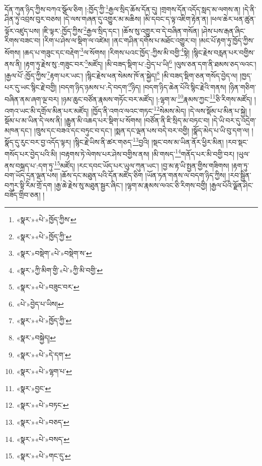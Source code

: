 \documentclass[12pt,a4paper]{book}
\begin{document}
དོན་ཀུན་ཉིད་ཀྱིས་བཀའ་སྩོལ་ཅིག །:ཁྱོད་ཀྱི་\footnote{«སྣར་»«པེ་»ཁྱོད་ཀྱིས་}རྒྱལ་སྲིད་ཆོས་དོན་དུ། །གྲགས་དོན་འདོད་སླད་མ་ལགས་ན། །དེ་ནི་ཤིན་ཏུ་འབྲས་བུར་བཅས། །དེ་ལས་གཞན་དུ་འགྱུར་མ་མཆིས། །མི་དབང་ད་ལྟ་འཇིག་རྟེན་ན། །ཕལ་ཆེར་ཕན་ཚུན་ལྟོར་འཛུད་པས། །ཇི་ལྟར་:ཁྱོད་ཀྱིས་\footnote{«སྣར་»«པེ་»ཁྱོད་ཀྱི་}རྒྱལ་སྲིད་དང་། །ཆོས་སུ་འགྱུར་བ་དེ་བཞིན་གསོན། །ཤེས་པས་རྒན་ཞིང་རིགས་བཟང་བ། །རིག་པ་ཤེས་ལ་སྡིག་ལ་འཛེམ། །ནང་གཤིན་དགོས་པ་མཐོང་འགྱུར་བ། །མང་པོ་རྟག་ཏུ་ཁྱོད་ཀྱིས་སོགས། །ཆད་པ་གཟུང་དང་བརྡེག་\footnote{«སྣར་»བསྡེག་«པེ་»བསྡེག་ས་}ལ་སོགས། །རིགས་པའང་ཁྱོད་:ཀྱིས་མི་བགྱི་\footnote{«སྣར་»ཀྱི་མིག་གྱི་«པེ་»ཀྱི་མི་བགྱི་}སྟེ། །སྙིང་རྗེས་བརླན་པར་བགྱིས་ནས་ནི། །རྟག་ཏུ་རྗེས་སུ་:གཟུང་བར་\footnote{«སྣར་»«པེ་»བཟུང་བར་}མཛོད། །མི་བཟད་སྡིག་པ་:བྱེད་པ་ཡི།\footnote{«པེ་»བྱེད་པ་ཡིས།} །ལུས་ཅན་དག་ནི་ཐམས་ཅད་ལའང་། །རྒྱལ་པོ་:ཁྱོད་ཀྱིས་\footnote{«སྣར་»«པེ་»ཁྱོད་ཀྱི་}རྟག་པར་ཡང་། །སྙིང་རྗེས་ཕན་སེམས་ཁོ་ན་སྐྱེད།\footnote{«སྣར་»བསྐྱེད།} །མི་བཟད་སྡིག་ཅན་གསོད་བྱེད་ལ། །ཁྱད་པར་དུ་ཡང་སྙིང་རྗེ་བགྱི། །བདག་ཉིད་ཉམས་པ་:དེ་བདག་\footnote{«སྣར་»«པེ་»དེ་དག་}ཉིད། །བདག་ཉིད་ཆེན་པོའི་སྙིང་རྗེའི་གནས། །ཉིན་གཅིག་བཞིན་ནམ་ཞག་ལྔ་བར། །ཉམ་ཆུང་བཙོན་རྣམས་གཏོང་བར་མཛོད། །:ལྷག་མ་\footnote{«སྣར་»«པེ་»ལྷག་པ་}རྣམས་ཀྱང་\footnote{«སྣར་»བྱང་}ཅི་རིགས་མཛོད། །འགའ་ཡང་མི་དགྲོལ་མིན་པར་མཛོད། །ཁྱོད་ནི་འགའ་ལའང་གཏང་\footnote{«སྣར་»«པེ་»བཏང་}སེམས་མེད། །དེ་ལས་སྡོམ་པ་མིན་པ་སྐྱེ། །སྡོམ་པ་མ་ཡིན་དེ་ལས་ནི། །རྒྱུན་མི་འཆད་པར་སྡིག་པ་སོགས། །བཙོན་ནི་ཇི་སྲིད་མ་བཏང་བ། །དེ་ཡི་བར་དུ་འདྲེག་མཁན་དང་། །ཁྲུས་དང་བཟའ་དང་བཏུང་བ་དང་། །སྨན་དང་ལྡན་པས་བདེ་བར་བགྱི། །སྣོད་མེད་པ་ཡི་བུ་དག་ལ། །སྣོད་དུ་རུང་བར་བྱ་འདོད་ལྟར། །སྙིང་རྗེ་ཡིས་ནི་ཚར་གཅད་\footnote{«སྣར་»«པེ་»བཅད་}བྱའི། །སྡང་བས་མ་ཡིན་ནོར་ཕྱིར་མིན། །རབ་སྡང་གསོད་པར་བྱེད་པའི་མི། །བརྟགས་ཏེ་ལེགས་པར་ཤེས་བགྱིས་ནས། །མི་གསད་\footnote{«སྣར་»«པེ་»བསད་}གནོད་པར་མི་བགྱི་བར། །ཡུལ་ནས་བསྐྲད་པ་:དག་ཏུ་\footnote{«སྣར་»«པེ་»གང་དུ་}མཛོད། །རང་དབང་ཡོད་པར་ཡུལ་ཀུན་ཡང་། །བྱ་མ་རྟ་ཡི་སྤྱན་གྱིས་གཟིགས། །རྟག་ཏུ་བག་ཡོད་དྲན་ལྡན་པས། །ཆོས་དང་མཐུན་པའི་དོན་མཛོད་ཅིག །ཡོན་ཏན་གནས་ལ་བདག་ཉིད་ཀྱིས། །རབ་སྦྱིན་བཀུར་སྟི་རིམ་གྲོ་དག །རྒྱ་ཆེ་རྗེས་སུ་མཐུན་སྦྱར་ཞིང་། །ལྷག་མ་རྣམས་ལའང་ཅི་རིགས་བགྱི། །རྒྱལ་པོའི་ལྗོན་ཤིང་བཟོད་གྲིབ་ཅན། །
\end{document}

